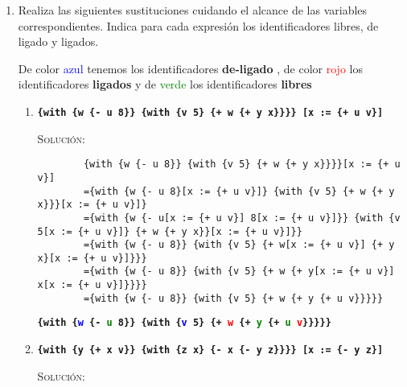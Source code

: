 \documentclass[letterpaper,11pt]{article}
\begin{document}
\begin{enumerate}
\begin{proof}
        \newpage
        Así, 
        \begin{center}
            \texttt{(length (ligada e)) $= 5 \not \leq 1$ (length (de-ligado e))}
        \end{center}

        Por lo tanto, la desigualdad \texttt{(length (ligada e)) $\leq$ 
        (length (de-ligado e))} es falsa.

    \end{proof}

    \item Realiza las siguientes sustituciones cuidando el alcance de las 
    variables correspondientes. Indica para cada expresión los identificadores 
    libres, de ligado y ligados. 
    
    De color \textcolor{blue}{azul} tenemos los identificadores \textbf{de-ligado} , de 
    color \textcolor{red}{rojo} los identificadores \textbf{ligados} y de \textcolor{green}{verde}
    los identificadores \textbf{libres}
    \begin{enumerate}
        \item \texttt{\textbf{\{with \{w \{- u 8\}\} \{with \{v 5\} 
        \{+ w \{+ y x\}\}\}\} {[}x := \{+ u v\}{]}}}

        \textsc{Solución:}
        
        \begin{verbatim}
        {with {w {- u 8}} {with {v 5} {+ w {+ y x}}}}[x := {+ u v}]
        ={with {w {- u 8}[x := {+ u v}]} {with {v 5} {+ w {+ y x}}}[x := {+ u v}]}
        ={with {w {- u[x := {+ u v}] 8[x := {+ u v}]}} {with {v 5[x := {+ u v}]} {+ w {+ y x}}[x := {+ u v}]}}
        ={with {w {- u 8}} {with {v 5} {+ w[x := {+ u v}] {+ y x}[x := {+ u v}]}}}
        ={with {w {- u 8}} {with {v 5} {+ w {+ y[x := {+ u v}] x[x := {+ u v}]}}}}
        ={with {w {- u 8}} {with {v 5} {+ w {+ y {+ u v}}}}}
        \end{verbatim}
        \texttt{\textbf{\{with \{\textcolor{blue}{w} \{- \textcolor{green}{u} 8\}\} \{with 
        \{\textcolor{blue}{v} 5\} \{+ \textcolor{red}{w} \{+ \textcolor{green}{y} 
        \{+ \textcolor{green}{u} \textcolor{red}{v}\}\}\}\}\}}}


        \item \texttt{\textbf{\{with \{y \{+ x v\}\} \{with \{z x\} 
        \{- x \{- y z\}\}\}\} [x := \{- y z\}]}}

        \textsc{Solución:}
        

\end{enumerate}
\end{enumerate}
\end{document}
